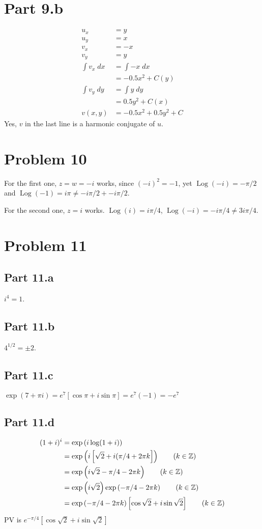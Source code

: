 \documentclass{article}
\theoremstyle{definition}
\newcommand{\Z}{\mathbb{Z}}
\newcommand{\p}[1]{\left(#1\right)}
\newcommand{\sq}[1]{\left[#1\right]}
\begin{document}
\section{Part 9.b}
\begin{align*}
u_x &= y \\
u_y &= x \\
v_x &= -x \tag{C-R} \\
v_y &= y \tag{C-R} \\
\int v_x \;dx 
&= \int -x \;dx \\
&= -0.5 x^2 +C(y) \\
\int v_y \;dy
&= \int y \;dy \\
&= 0.5 y^2 + C(x) \\
v(x,y) &= -0.5x^2 + 0.5 y^2 + C
\end{align*}
Yes, $v$ in the last line is a harmonic conjugate of $u$.

\section{Problem 10}
For the first one, $z=w=-i$ works, since $(-i)^2=-1$, yet
$\operatorname{Log}(-i) = -\pi/2$ and $\operatorname{Log}(-1) 
= i\pi \neq -i\pi/2 + -i\pi/2$.

For the second one, $z=i$ works. $\operatorname{Log}(i) 
= i\pi/4$, $\operatorname{Log}(-i) = -i\pi/4 \neq 3i\pi/4$.

\section{Problem 11}
\subsection{Part 11.a}
$i^4=1$.
\subsection{Part 11.b}
$4^{1/2} = \pm 2$.
\subsection{Part 11.c}
$\exp(7+\pi i) = e^7 \sq{\cos \pi + i \sin \pi} = e^7(-1) = -e^7$
\subsection{Part 11.d}
\begin{align*}
(1+i)^i 
&= \exp\p{ i \log (1+i) } \\
&= \exp\p{ i \sq{\sqrt{2} + i(\pi/4 + 2\pi k}} \tag{$k \in \Z$}\\
&= \exp\p{ i \sqrt{2} - \pi/4 - 2\pi k } \tag{$k \in \Z$}\\
&= \exp\p{ i \sqrt{2}} \exp\p{-\pi/4 - 2 \pi k} \tag{$k \in \Z$}\\
&= \exp\p{-\pi/4 - 2 \pi k} \sq{\cos\sqrt{2} + i\sin \sqrt{2}} \tag{$k \in \Z$}\\
\end{align*}
PV is $e^{-\pi/4} \sq{\cos \sqrt{2} + i\sin\sqrt{2}}$
\end{document}
